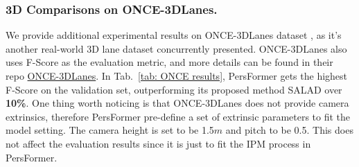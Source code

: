 \documentclass[runningheads]{llncs}
\begin{document}
\subsubsection{3D Comparisons on ONCE-3DLanes.}
We provide additional experimental results on ONCE-3DLanes dataset \cite{yan2022once3dlane}, as it's another real-world 3D lane dataset concurrently presented.
ONCE-3DLanes also uses F-Score as the evaluation metric, and more details can be found in their repo \href{https://github.com/once-3dlanes/once_3dlanes_benchmark}{ONCE-3DLanes}.
In Tab.~\ref{tab: ONCE results}, PersFormer gets the highest F-Score on the validation set, outperforming its proposed method SALAD \cite{yan2022once3dlane} over \textbf{10\%}.
One thing worth noticing is that ONCE-3DLanes does not provide camera extrinsics, therefore PersFormer pre-define a set of extrinsic parameters to fit the model setting.
The camera height is set to be 1.5$m$ and pitch to be 0.5.
This does not affect the evaluation results since it is just to fit the IPM process in PersFormer.

\begin{table*}[t!]
\caption{New results on the new benchmark (CVPR22) ONCE-3DLanes~\cite{yan2022once3dlane}. $^*$ denotes results from the paper~\cite{yan2022once3dlane}}
\centering
\label{tab: ONCE results}
\end{table*}
\end{document}
